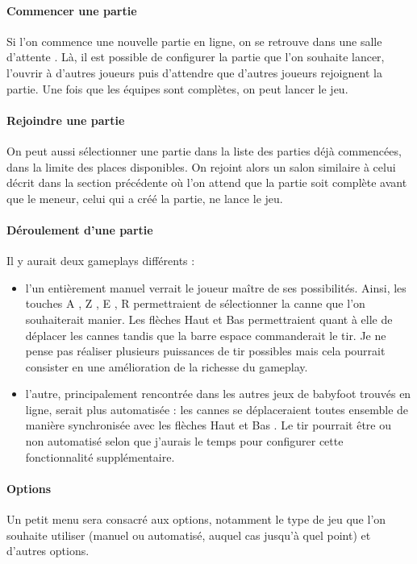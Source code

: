 \documentclass[a4paper,12pt]{report}
\begin{document}
\paragraph{Commencer une partie}
Si l'on commence une nouvelle partie en ligne, on se retrouve dans une \og salle d'attente \fg. Là, il est possible de configurer la partie que l'on souhaite lancer, l'ouvrir à d'autres joueurs puis d'attendre que d'autres joueurs rejoignent la partie. Une fois que les équipes sont complètes, on peut lancer le jeu.
\paragraph{Rejoindre une partie}
On peut aussi sélectionner une partie dans la liste des parties déjà commencées, dans la limite des places disponibles. On rejoint alors un salon similaire à celui décrit dans la section précédente où l'on attend que la partie soit complète avant que le meneur, celui qui a créé la partie, ne lance le jeu.
\paragraph{Déroulement d'une partie}
Il y aurait deux gameplays différents : 
\begin{itemize}
    \item l'un entièrement manuel verrait le joueur maître de ses possibilités. Ainsi, les touches \og A \fg, \og Z \fg, \og E \fg, \og R \fg permettraient de sélectionner la canne que l'on souhaiterait manier. Les flèches \og Haut \fg et \og Bas \fg permettraient quant à elle de déplacer les cannes tandis que la barre espace commanderait le tir. Je ne pense pas réaliser plusieurs puissances de tir possibles mais cela pourrait consister en une amélioration de la richesse du gameplay.
    \item l'autre, principalement rencontrée dans les autres jeux de babyfoot trouvés en ligne, serait plus automatisée : les cannes se déplaceraient toutes ensemble de manière synchronisée avec les flèches \og Haut \fg et \og Bas \fg. Le tir pourrait être ou non automatisé selon que j'aurais le temps pour configurer cette fonctionnalité supplémentaire.
\end{itemize}
\paragraph{Options}
Un petit menu sera consacré aux options, notamment le type de jeu que l'on souhaite utiliser (manuel ou automatisé, auquel cas jusqu'à quel point) et d'autres options.
\end{document}

